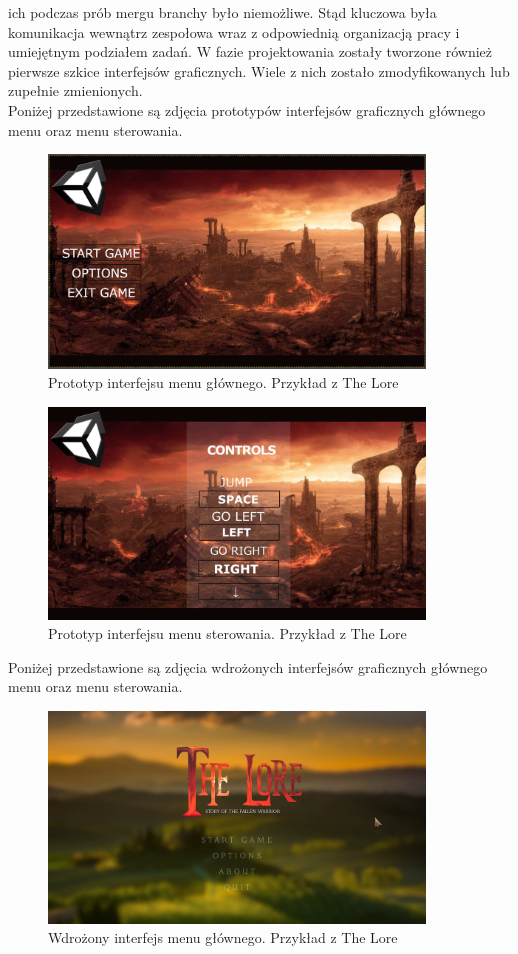 \documentclass[oneside,polski,logo]{amuthesis}
\begin{document}
ich podczas prób mergu branchy było niemożliwe. Stąd kluczowa była komunikacja wewnątrz zespołowa wraz z odpowiednią organizacją pracy i umiejętnym podziałem zadań. W fazie projektowania zostały tworzone również pierwsze szkice interfejsów graficznych. Wiele z nich zostało zmodyfikowanych lub zupełnie zmienionych.\\
Poniżej przedstawione są zdjęcia prototypów interfejsów graficznych głównego menu oraz menu sterowania.\\

\begin{figure}[h]
	\centering
	\includegraphics[width=10cm]{images/hyps/proto.png}
	\caption{Prototyp interfejsu menu głównego. Przykład z The Lore}
\end{figure}

\begin{figure}[h]
	\centering
	\includegraphics[width=10cm]{images/hyps/proto2.jpg}
	\caption{Prototyp interfejsu menu sterowania. Przykład z The Lore}
\end{figure}

Poniżej przedstawione są zdjęcia wdrożonych interfejsów graficznych głównego menu oraz menu sterowania.\\

\begin{figure}[h]
	\centering
	\includegraphics[width=10cm]{images/hyps/of1.png}
	\caption{Wdrożony interfejs menu głównego. Przykład z The Lore}
\end{figure}
\end{document}
